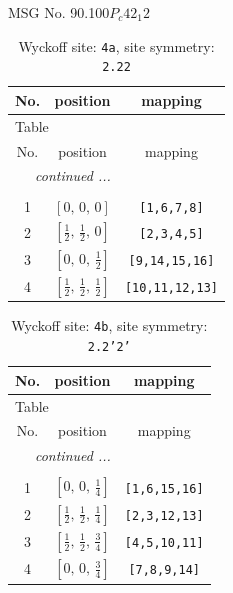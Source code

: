 \documentclass[fleqn,8pt]{jsarticle}
\begin{document}
\setcounter{MaxMatrixCols}{32}

\renewcommand{\tablename}{Table~}
\renewcommand{\figurename}{Figure~}
\begin{center}
\LARGE
MSG No. 90.100\quad$P_{c}42_{1}2$
\end{center}
\renewcommand{\arraystretch}{1.2}
\begin{longtable}{ccc}
\caption{Wyckoff site: {\tt 4a}, site symmetry: {\tt 2.22}}
 \\
 \hline \hline
No. & position & mapping \\ \hline \endfirsthead

\multicolumn{2}{l}{\tablename\ \thetable{}} \\
 \hline \hline
No. & position & mapping \\ \hline \endhead

 \hline \hline
\multicolumn{2}{r}{\footnotesize\it continued ...} \\ \endfoot

 \hline \hline
\multicolumn{2}{r}{} \\ \endlastfoot

1 & $\left[ 0,\, 0,\, 0 \right]$ & {\tt [1,6,7,8]} \\ \hline
2 & $\left[ \frac{1}{2},\, \frac{1}{2},\, 0 \right]$ & {\tt [2,3,4,5]} \\ \hline
3 & $\left[ 0,\, 0,\, \frac{1}{2} \right]$ & {\tt [9,14,15,16]} \\ \hline
4 & $\left[ \frac{1}{2},\, \frac{1}{2},\, \frac{1}{2} \right]$ & {\tt [10,11,12,13]} \\
\end{longtable}
\renewcommand{\arraystretch}{1.2}
\begin{longtable}{ccc}
\caption{Wyckoff site: {\tt 4b}, site symmetry: {\tt 2.2'2'}}
 \\
 \hline \hline
No. & position & mapping \\ \hline \endfirsthead

\multicolumn{2}{l}{\tablename\ \thetable{}} \\
 \hline \hline
No. & position & mapping \\ \hline \endhead

 \hline \hline
\multicolumn{2}{r}{\footnotesize\it continued ...} \\ \endfoot

 \hline \hline
\multicolumn{2}{r}{} \\ \endlastfoot

1 & $\left[ 0,\, 0,\, \frac{1}{4} \right]$ & {\tt [1,6,15,16]} \\ \hline
2 & $\left[ \frac{1}{2},\, \frac{1}{2},\, \frac{1}{4} \right]$ & {\tt [2,3,12,13]} \\ \hline
3 & $\left[ \frac{1}{2},\, \frac{1}{2},\, \frac{3}{4} \right]$ & {\tt [4,5,10,11]} \\ \hline
4 & $\left[ 0,\, 0,\, \frac{3}{4} \right]$ & {\tt [7,8,9,14]} \\
\end{longtable}
\end{document}

